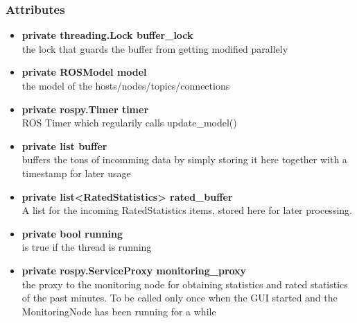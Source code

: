 \subsubsection{Attributes}
\begin{itemize}
  \item \textbf{private threading.Lock buffer\_lock} \\
  the lock that guards the buffer from getting modified parallely
  \item \textbf{private ROSModel model}\\ 
  the model of the hosts/nodes/topics/connections
  \item \textbf{private rospy.Timer timer} \\
  ROS Timer which regularily calls update\_model()
  \item \textbf{private list buffer}\\
  buffers the tons of incomming data by
  simply storing it here together with a timestamp for later usage
  \item \textbf{private list<RatedStatistics> rated\_buffer}\\ 
  A list for the incoming RatedStatistics items, stored here for later
  processing.
  \item \textbf{private bool running}\\
  is true if the thread is running
  \item \textbf{private rospy.ServiceProxy monitoring\_proxy}\\ 
  the proxy to the monitoring node for obtaining statistics and rated
  statistics of the past minutes. To be called only once when the GUI started
  and the MonitoringNode has been running for a while
\end{itemize}
